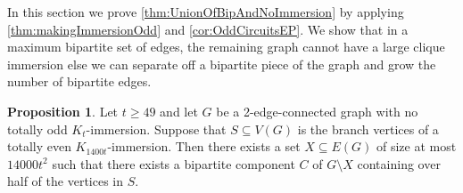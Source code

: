 \documentclass{article}
\theoremstyle{definition}
\newtheorem{proposition}[environment]{Proposition}
\begin{document}
In this section we prove \cref{thm:UnionOfBipAndNoImmersion} by applying \cref{thm:makingImmersionOdd} and \cref{cor:OddCircuitsEP}. We show that in a maximum bipartite set of edges, the remaining graph cannot have a large clique immersion else we can separate off a bipartite piece of the graph and grow the number of bipartite edges.

\begin{proposition}\label{prop:ImmersionGivesEdgeCut}
    Let $t \geq 49$ and let $G$ be a 2-edge-connected graph with no totally odd $K_t$-immersion. Suppose that $S \subseteq V(G)$ is the branch vertices of a totally even $K_{1400t}$-immersion. Then there exists a set $X \subseteq E(G)$ of size at most $14000t^2$ such that there exists a bipartite component $C$ of $G \setminus X$ containing over half of the vertices in $S$.
\end{proposition}
\end{document}
